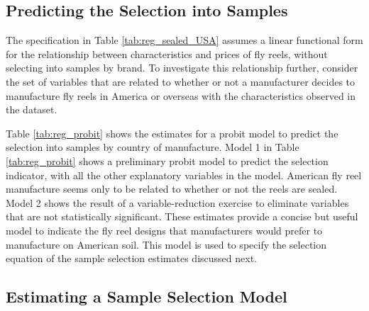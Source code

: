 \documentclass[11pt]{paper}
\begin{document}
\subsection{Predicting the Selection into Samples}


The specification in 
Table \ref{tab:reg_sealed_USA}
assumes a linear functional form for
the relationship between characteristics and prices of fly reels, 
without selecting into samples by brand.
% 
To investigate this relationship further, 
consider the set of variables that are related to
whether or not 
a manufacturer decides to manufacture fly reels in 
America or overseas
with the characteristics observed in the dataset. 



Table \ref{tab:reg_probit} 
shows the estimates for a probit model to predict the selection
into samples by country of manufacture.
% 
Model 1 in Table \ref{tab:reg_probit} 
shows a preliminary probit model to predict the selection indicator,
with all the other explanatory variables in the model.
American fly reel manufacture seems only to be related to 
whether or not the reels are sealed.
% 
Model 2 shows the result of a variable-reduction exercise
to eliminate variables that are not statistically significant.
These estimates provide a concise but useful model to
indicate the fly reel designs that manufacturers would 
prefer to manufacture on American soil.
This model is used to specify the selection equation
of the sample selection estimates discussed next. 


\subsection{Estimating a Sample Selection Model}






\end{document}
